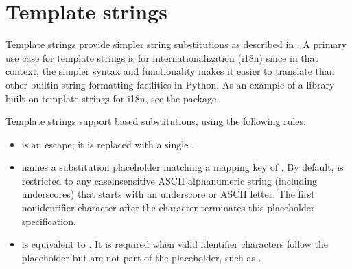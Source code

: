 \documentclass[letterpaper,10pt,english]{sphinxmanual}
\begin{document}
\begin{sphinxVerbatim}[commandchars=\\\{\}]
    
\end{sphinxVerbatim}


\section{Template strings}
\label{\detokenize{string:template-strings}}\label{\detokenize{string:id1}}
Template strings provide simpler string substitutions as described in
.  A primary use case for template strings is for
internationalization (i18n) since in that context, the simpler syntax and
functionality makes it easier to translate than other built\sphinxhyphen{}in string
formatting facilities in Python.  As an example of a library built on template
strings for i18n, see the
 package.

\ignorespaces
Template strings support \sphinxcode{\sphinxupquote{\$}}\sphinxhyphen{}based substitutions, using the following rules:
\begin{itemize}
\item {}
\sphinxcode{\sphinxupquote{\$\$}} is an escape; it is replaced with a single \sphinxcode{\sphinxupquote{\$}}.

\item {}
 names a substitution placeholder matching a mapping key of
.  By default,  is restricted to any
case\sphinxhyphen{}insensitive ASCII alphanumeric string (including underscores) that
starts with an underscore or ASCII letter.  The first non\sphinxhyphen{}identifier
character after the \sphinxcode{\sphinxupquote{\$}} character terminates this placeholder
specification.

\item {}
 is equivalent to .  It is required when
valid identifier characters follow the placeholder but are not part of the
placeholder, such as .

\end{itemize}
\end{document}
